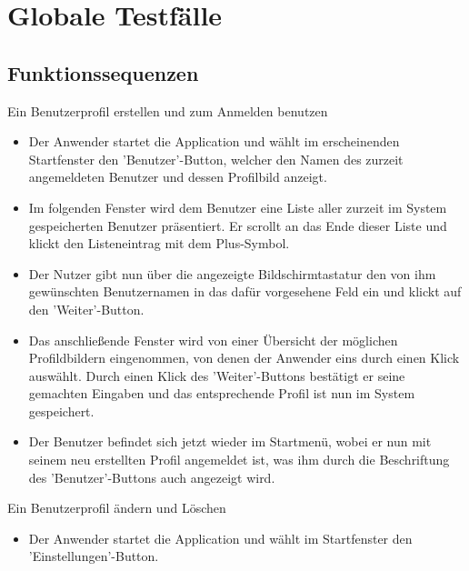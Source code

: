 

\section{Globale Testfälle}

\subsection{Funktionssequenzen}

\begin{requirements}

	 Ein Benutzerprofil erstellen und zum Anmelden benutzen
	
	\begin{itemize}
  			\item Der Anwender startet die Application und wählt im erscheinenden Startfenster den 'Benutzer'-Button, welcher den Namen des zurzeit angemeldeten Benutzer und dessen Profilbild anzeigt.
  			
  			\item Im folgenden Fenster wird dem Benutzer eine Liste aller zurzeit im System gespeicherten Benutzer präsentiert. Er scrollt an das Ende dieser Liste und klickt den Listeneintrag mit dem Plus-Symbol.
  			
  			\item Der Nutzer gibt nun über die angezeigte Bildschirmtastatur den von ihm gewünschten Benutzernamen in das dafür vorgesehene Feld ein und klickt auf den 'Weiter'-Button. 
  			
  			\item Das anschließende Fenster wird von einer Übersicht der möglichen Profildbildern eingenommen, von denen der Anwender eins durch einen Klick auswählt. Durch einen Klick des 'Weiter'-Buttons bestätigt er seine gemachten Eingaben und das entsprechende Profil ist nun im System gespeichert. 
  			
  			\item Der Benutzer befindet sich jetzt wieder im Startmenü, wobei er nun mit seinem neu erstellten Profil angemeldet ist, was ihm durch die Beschriftung des 'Benutzer'-Buttons auch angezeigt wird.

  			
	\end{itemize}
	
	
	 Ein Benutzerprofil ändern und Löschen 
	
	\begin{itemize}
  			\item Der Anwender startet die Application und wählt im  Startfenster den 'Einstellungen'-Button.
  			

\end{itemize}
\end{requirements}
